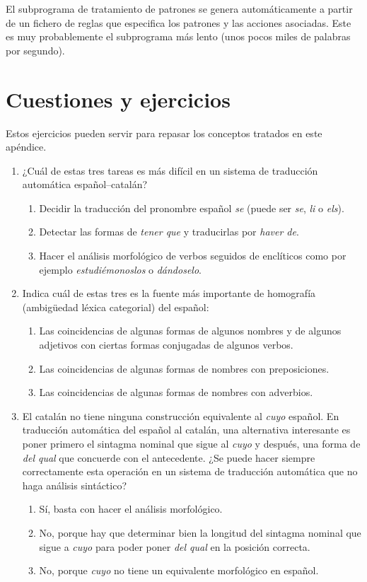 {El subprograma de tratamiento de patrones se genera automáticamente a partir de un fichero de reglas que especifica los patrones y las acciones asociadas. Este es muy probablemente el subprograma más lento (unos pocos miles de palabras por segundo). 

\section{Cuestiones y ejercicios} Estos ejercicios pueden servir para repasar los conceptos tratados en este apéndice. \begin{enumerate} \item¿Cuál de estas tres tareas es más difícil en un sistema de traducción automática español--catalán? \begin{enumerate} \item Decidir la traducción del pronombre español \emph{se} (puede ser \emph{se}, \emph{li} o \emph{els}). \item Detectar las formas de \emph{tener que} y traducirlas por \emph{haver de}. \item Hacer el análisis morfológico de verbos seguidos de enclíticos como por ejemplo \emph{estudiémonoslos} o \emph{dándoselo}. \end{enumerate} 

\item Indica cuál de estas tres es la fuente más importante de homografía (ambigüedad léxica categorial) del español: \begin{enumerate} \item Las coincidencias de algunas formas de algunos nombres y de algunos adjetivos con ciertas formas conjugadas de algunos verbos. \item Las coincidencias de algunas formas de nombres con preposiciones. \item Las coincidencias de algunas formas de nombres con adverbios. \end{enumerate} 

\item El catalán no tiene ninguna construcción equivalente al \emph{cuyo} español. En traducción automática del español al catalán, una alternativa interesante es poner primero el sintagma nominal que sigue al \emph{cuyo} y después, una forma de \emph{del qual} que concuerde con el antecedente. ¿Se puede hacer siempre correctamente esta operación en un sistema de traducción automática que no haga análisis sintáctico? \begin{enumerate} \item Sí, basta con hacer el análisis morfológico. \item No, porque hay que determinar bien la longitud del sintagma nominal que sigue a \emph{cuyo} para poder poner \emph{del qual} en la posición correcta. \item No, porque \emph{cuyo} no tiene un equivalente morfológico en español. \end{enumerate} 


\end{enumerate}}
